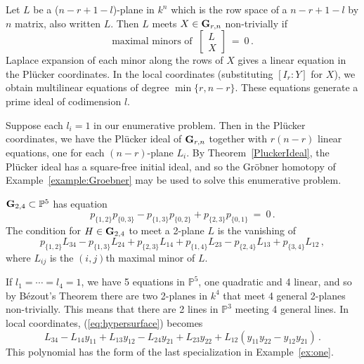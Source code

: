 Let $L$ be a ($n-r+1-l$)-plane in $k^n$ which is the row space of
a $n-r+1-l$ by $n$ matrix, also written $L$.
Then $L$ meets $X\in{\bf G}_{r,n}$ non-trivially if
$$
  \mbox{maximal minors of }\ 
  \left[\begin{array}{c}L\\X\end{array}\right]\ =\ 0\,.
$$
Laplace expansion of each minor along the rows of $X$ gives a linear
equation in the Pl\"ucker coordinates.
In the local coordinates (substituting $[I_r:Y]$ for $X$), we obtain
multilinear equations of degree $\min\{r,n-r\}$.
These equations generate a prime ideal of codimension $l$.

Suppose each $l_i=1$ in our enumerative problem.
Then in the Pl\"ucker coordinates, we have the Pl\"ucker ideal of 
${\bf G}_{r,n}$
together with $r(n-r)$ linear equations, one for each
$(n{-}r)$-plane $L_i$.
By Theorem~\ref{PluckerIdeal}, the Pl\"ucker ideal has a square-free initial
ideal\index{initial ideal!square-free}, and so the Gr\"obner
homotopy of 
Example~\ref{example:Groebner} may be 
used to solve this enumerative problem.

\begin{example}\label{ex:G22}
${\bf G}_{2,4}\subset{\mathbb P}^5$ has equation
%
\begin{equation}\label{eq:G22}
   p_{\{1,2\}}p_{\{0,3\}}-p_{\{1,3\}}p_{\{0,2\}}+ p_{\{2,3\}}p_{\{0,1\}}
   \ =\ 0\,.
\end{equation}
%
The condition for $H\in{\bf G}_{2,4}$ to meet a 2-plane $L$ is the
vanishing of 
\begin{equation}\label{eq:hypersurface}
    p_{\{1,2\}}L_{34}-p_{\{1,3\}}L_{24}+p_{\{2,3\}}L_{14} 
  + p_{\{1,4\}}L_{23}-p_{\{2,4\}}L_{13}+p_{\{3,4\}}L_{12}\,,
\end{equation}
where $L_{ij}$ is the $(i,j)$th maximal minor of $L$.

If $l_1=\cdots=l_4=1$, we have 5 equations in ${\mathbb P}^5$, one quadratic
and 4 linear, and so by B\'ezout's Theorem there are
two 2-planes in $k^4$ that meet 4 general 2-planes non-trivially. 
This means that there are 2 lines in ${\mathbb P}^3$ meeting 4 general lines. 
In local coordinates, (\ref{eq:hypersurface}) becomes
$$
    L_{34}-L_{14}y_{11}+L_{13}y_{12}-L_{24}y_{21} 
  + L_{23}y_{22} + L_{12}(y_{11}y_{22}-y_{12}y_{21})\,.
$$
This polynomial has the form of the last specialization in
Example~\ref{ex:one}. 
\end{example}


